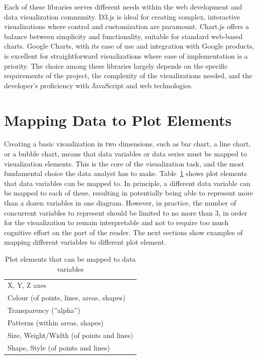 Each of these libraries serves different needs within the web development and data visualization community. D3.js is ideal for creating complex, interactive visualizations where control and customization are paramount. Chart.js offers a balance between simplicity and functionality, suitable for standard web-based charts. Google Charts, with its ease of use and integration with Google products, is excellent for straightforward visualizations where ease of implementation is a priority. The choice among these libraries largely depends on the specific requirements of the project, the complexity of the visualizations needed, and the developer's proficiency with JavaScript and web technologies.

\section{Mapping Data to Plot Elements}

Creating a basic visualization in two dimensions, such as  bar chart, a line chart, or a bubble chart, means that data variables or data series must be mapped to visualization elements. This is the core of the visualization task, and the most fundamental choice the data analyst has to make. Table~\ref{tab:elements} shows plot elements that data variables can be mapped to. In principle, a different data variable can be mapped to each of these, resulting in potentially being able to represent more than a dozen variables in one diagram. However, in practice, the number of concurrent variables to represent should be limited to no more than 3, in order for the visualization to remain interpretable and not to require too much cognitive effort on the part of the reader. The next sections show examples of mapping different variables to different plot element. 

\begin{table}[h]
\centering
\renewcommand{\arraystretch}{1.25}

\begin{tabular}{l} \hline
X, Y, Z axes \\
Colour (of points, lines, areas, shapes) \\ 
Transparency (''alpha'') \\
Patterns (within areas, shapes) \\
Size, Weight/Width (of points and lines) \\
Shape, Style (of points and lines) \\ \hline
\end{tabular}
\caption{Plot elements that can be mapped to data variables}
\label{tab:elements}
\end{table}

